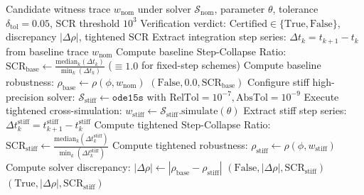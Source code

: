 \documentclass[journal]{IEEEtran}
\begin{document}
\begin{algorithm}[!t]
\footnotesize
\caption{Dual-Fidelity Solver Integrity Verification (Gate 2)}
\label{alg:gate2_verification}
\begin{algorithmic}[1]
\REQUIRE Candidate witness trace $w_{\text{nom}}$ under solver $\mathcal{S}_{\text{nom}}$, parameter $\theta$, tolerance $\delta_{\text{tol}} = 0.05$, SCR threshold $10^3$
\ENSURE Verification verdict: $\text{Certified} \in \{\text{True}, \text{False}\}$, discrepancy $|\Delta \rho|$, tightened SCR
\STATE Extract integration step series: $\Delta t_k = t_{k+1} - t_k$ from baseline trace $w_{\text{nom}}$
\STATE Compute baseline Step-Collapse Ratio: $\text{SCR}_{\text{base}} \leftarrow \frac{\text{median}_k(\Delta t_k)}{\min_k(\Delta t_k)}$ ($\equiv 1.0$ for fixed-step schemes)
\STATE Compute baseline robustness: $\rho_{\text{base}} \leftarrow \rho(\phi, w_{\text{nom}})$
    \RETURN $(\text{False}, 0.0, \text{SCR}_{\text{base}})$ 
\ENDIF
\STATE Configure stiff high-precision solver: $\mathcal{S}_{\text{stiff}} \leftarrow \texttt{ode15s}$ with $\text{RelTol} = 10^{-7}, \text{AbsTol} = 10^{-9}$
\STATE Execute tightened cross-simulation: $w_{\text{stiff}} \leftarrow \mathcal{S}_{\text{stiff}}.\text{simulate}(\theta)$
\STATE Extract stiff step series: $\Delta t_k^{\text{stiff}} = t_{k+1}^{\text{stiff}} - t_k^{\text{stiff}}$
\STATE Compute tightened Step-Collapse Ratio: $\text{SCR}_{\text{stiff}} \leftarrow \frac{\text{median}_k(\Delta t_k^{\text{stiff}})}{\min_k(\Delta t_k^{\text{stiff}})}$
\STATE Compute tightened robustness: $\rho_{\text{stiff}} \leftarrow \rho(\phi, w_{\text{stiff}})$
\STATE Compute solver discrepancy: $|\Delta \rho| \leftarrow |\rho_{\text{base}} - \rho_{\text{stiff}}|$
    \RETURN $(\text{False}, |\Delta \rho|, \text{SCR}_{\text{stiff}})$ 
\ELSE
    \RETURN $(\text{True}, |\Delta \rho|, \text{SCR}_{\text{stiff}})$ 
\ENDIF
\end{algorithmic}
\end{algorithm}
\end{document}

